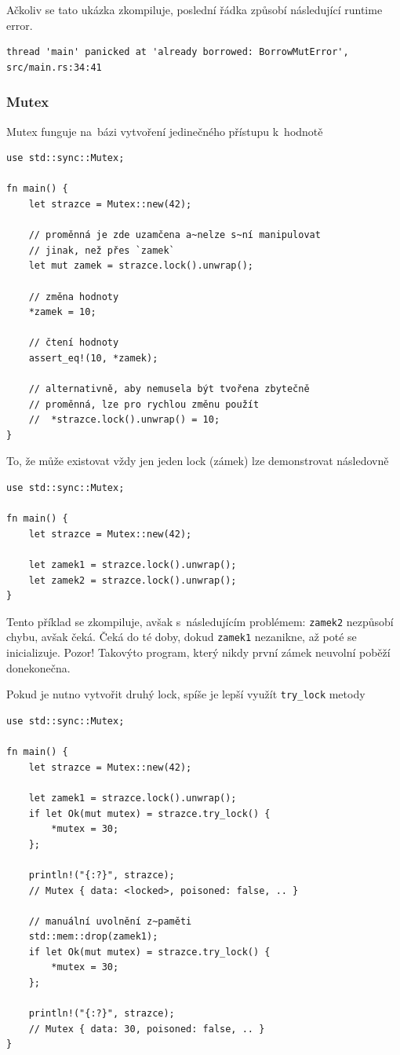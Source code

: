\documentclass[a4paper, 12pt]{article} %
\newcommand{\rust}[1]{\texttt{#1}}
\begin{document}
			Ačkoliv se tato ukázka zkompiluje, poslední řádka způsobí následující runtime error.
			\begin{verbatim}
thread 'main' panicked at 'already borrowed: BorrowMutError', src/main.rs:34:41
			\end{verbatim}

		\subsubsection*{Mutex}
			Mutex funguje na~bázi vytvoření jedinečného přístupu k~hodnotě
			\begin{verbatim}
use std::sync::Mutex;

fn main() {
	let strazce = Mutex::new(42);
	
	// proměnná je zde uzamčena a~nelze s~ní manipulovat
	// jinak, než přes `zamek`
	let mut zamek = strazce.lock().unwrap();
	
	// změna hodnoty
	*zamek = 10;
	
	// čtení hodnoty
	assert_eq!(10, *zamek);
	
	// alternativně, aby nemusela být tvořena zbytečně
	// proměnná, lze pro rychlou změnu použít
	//  *strazce.lock().unwrap() = 10;
}
			\end{verbatim}
			
			To, že může existovat vždy jen jeden lock (zámek) lze demonstrovat následovně
			\begin{verbatim}
use std::sync::Mutex;

fn main() {
	let strazce = Mutex::new(42);

	let zamek1 = strazce.lock().unwrap();
	let zamek2 = strazce.lock().unwrap();
}
			\end{verbatim}
			
			Tento příklad se zkompiluje, avšak s~následujícím problémem: \rust{zamek2} nezpůsobí chybu, avšak čeká. Čeká do té doby, dokud \rust{zamek1} nezanikne, až poté se inicializuje. Pozor! Takovýto program, který nikdy první zámek neuvolní poběží donekonečna.
			
			Pokud je nutno vytvořit druhý lock, spíše je lepší využít \rust{try_lock} metody
			\begin{verbatim}
use std::sync::Mutex;

fn main() {
	let strazce = Mutex::new(42);

	let zamek1 = strazce.lock().unwrap();
	if let Ok(mut mutex) = strazce.try_lock() {
		*mutex = 30;
	};

	println!("{:?}", strazce);
	// Mutex { data: <locked>, poisoned: false, .. }

	// manuální uvolnění z~paměti
	std::mem::drop(zamek1);
	if let Ok(mut mutex) = strazce.try_lock() {
		*mutex = 30;
	};

	println!("{:?}", strazce);
	// Mutex { data: 30, poisoned: false, .. }
}
			\end{verbatim}
			
\end{document}

